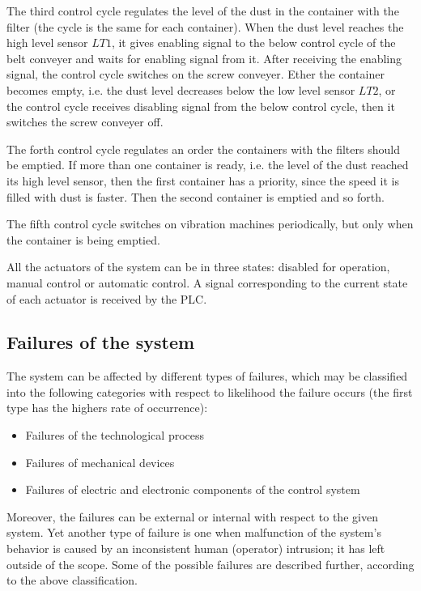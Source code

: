 The third control cycle regulates the level of the dust in the container
with the filter (the cycle is the same for each container). When the dust level
reaches the high level sensor $LT1$, it gives enabling signal to the below
control cycle of the belt conveyer and waits for enabling signal from it. After
receiving the enabling signal, the control cycle switches on the screw conveyer.
Ether the container becomes empty, i.e. the dust level decreases below the low
level sensor $LT2$, or the control cycle receives disabling signal from the
below control cycle, then it switches the screw conveyer off.

The forth control cycle regulates an order the containers with the filters
should be emptied. If more than one container is ready, i.e. the level of the
dust reached its high level sensor, then the first container has a priority,
since the speed it is filled with dust is faster. Then the second
container is emptied and so forth.

The fifth control cycle switches on vibration machines periodically, but only
when the container is being emptied.

All the actuators of the system can be in three states: disabled for operation,
manual control or automatic control. A signal corresponding to
the current state of each actuator is received by the PLC.


\subsection{Failures of the system}

The system can be affected by different types of failures, which may be
classified into the following categories with respect to likelihood the failure
occurs (the first type has the highers rate of occurrence):

\begin{itemize}
  \item Failures of the technological process
  \item Failures of mechanical devices
  \item Failures of electric and electronic components of the control system
\end{itemize}

Moreover, the failures can be external or internal with respect to the given
system. Yet another type of failure is one when malfunction of the system's
behavior is caused by an inconsistent human (operator) intrusion; it has left
outside of the scope. Some of the possible failures are described further,
according to the above classification.

